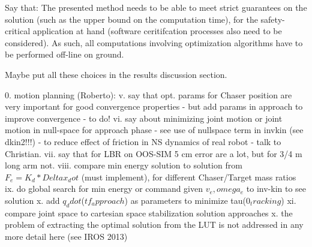 Say that: The presented method needs to be able to meet strict guarantees on the solution (such as the upper bound on the computation time), for the safety-critical application at hand (software ceritifcation processes also need to be considered). As such, all computations involving optimization algorithms have to be performed off-line on ground. 


Maybe put all these choices in the results discussion section.


0. motion planning (Roberto):
	v. say that opt. params for Chaser position are very important for good convergence properties - but add params in approach to improve convergence - to do!
	vi. say about minimizing joint motion or joint motion in null-space for approach phase - see use of nullspace term in invkin (see dkin2!!!) - to reduce effect of friction in NS dynamics of real robot - talk to Christian.
	vii. say that for LBR on OOS-SIM 5 cm error are a lot, but for 3/4 m long arm not.
	viii. compare min energy solution to solution from $F_e=K_d * Deltax_dot$ (must implement), for different Chaser/Target mass ratios
	ix. do global search for min energy or command given $v_e, omega_e$ to inv-kin to see solution
	x. add $q_ddot$($tf_approach$) as parameters to minimize tau($0_tracking$)
	xi. compare joint space to cartesian space stabilization solution approaches
	x. the problem of extracting the optimal solution from the LUT is not addressed in any more detail here (see IROS 2013)

